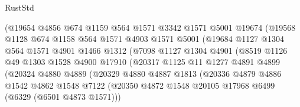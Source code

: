 \begin{lexlean}{RustStd}
\begin{coremodule}
{{                        (@19654
                          @4856
                          @674
                          @1159
                          @564
                          @1571
                          @3342
                          @1571
                          @5001
                          @19674
                          (@19568
                            @1128
                            @674
                            @1158
                            @564
                            @1571
                            @4903
                            @1571
                            @5001
                            (@19684
                              @1127
                              @1304
                              @564
                              @1571
                              @4901
                              @1466
                              @1312
                              (@7098
                                @1127
                                @1304
                                @4901
                                (@8519
                                  @1126
                                  @49
                                  @1303
                                  @1528
                                  @4900
                                  @17910
                                  (@20317
                                    @1125
                                    @11
                                    @1277
                                    @4891
                                    @4899
                                    (@20324
                                      @4880
                                      @4889
                                      (@20329
                                        @4880
                                        @4887
                                        @1813
                                        (@20336
                                          @4879
                                          @4886
                                          @1542
                                          @4862
                                          @1548
                                          @7122
                                          (@20350
                                            @4872
                                            @1548
                                            @20105
                                            @17968
                                            @6499
                                            (@6329 (@6501 @4873 @1571)))
}}
\end{coremodule}
\end{lexlean}
